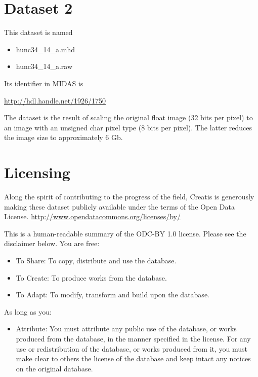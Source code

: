 \documentclass{InsightArticle}
\begin{document}
\section{Dataset 2}

This dataset is named

\begin{itemize}
\item hunc34\_14\_a.mhd
\item hunc34\_14\_a.raw
\end{itemize}

Its identifier in MIDAS is

\url{http://hdl.handle.net/1926/1750}

The dataset is the result of scaling the original float image (32 bits per pixel)
to an image with an unsigned char pixel type (8 bits per pixel). The latter
reduces the image size to approximately 6 Gb.

\section{Licensing}

Along the spirit of contributing to the progress of the field, Creatis is
generously making these dataset publicly available under the terms of the Open
Data License.
\url{http://www.opendatacommons.org/licenses/by/}

This is a human-readable summary of the ODC-BY 1.0 license. Please see the disclaimer below.
You are free:\\

\begin{itemize}
\item To Share: To copy, distribute and use the database.
\item To Create: To produce works from the database.
\item To Adapt: To modify, transform and build upon the database.
\end{itemize}

As long as you:\\

\begin{itemize}
\item Attribute: You must attribute any public use of the database, or works
produced from the database, in the manner specified in the license. For any use
or redistribution of the database, or works produced from it, you must make
clear to others the license of the database and keep intact any notices on the
original database.
\end{itemize}
\end{document}

